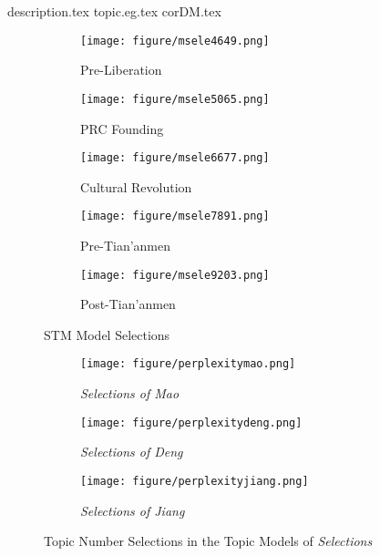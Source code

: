 \documentclass[abstracton,UTF8]{ctexart}
\begin{document}
\clearpage



\clearpage
\appendix
\appendixpage
\addappheadtotoc

{description.tex}
{topic.eg.tex}
{corDM.tex}






\begin{figure}[ht]
	\begin{subfigure}{0.45\textwidth}
		\texttt{[image: figure/msele4649.png]}
		\caption{Pre-Liberation}
		\label{f:msele46}
	\end{subfigure}
	\begin{subfigure}{0.45\textwidth}
		\texttt{[image: figure/msele5065.png]}
		\caption{PRC Founding}
		\label{f:msele50}
	\end{subfigure}
	\begin{subfigure}{0.45\textwidth}
		\texttt{[image: figure/msele6677.png]}
		\caption{Cultural Revolution}
		\label{f:msele66}
	\end{subfigure}
	\begin{subfigure}{0.45\textwidth}
		\texttt{[image: figure/msele7891.png]}
		\caption{Pre-Tian'anmen}
		\label{f:msele78}
	\end{subfigure}
	\begin{subfigure}{0.45\textwidth}
		\texttt{[image: figure/msele9203.png]}
		\caption{Post-Tian'anmen}
		\label{f:msele92}
	\end{subfigure}
	\caption{STM Model Selections}
	\label{f:mselermrb}
\end{figure}


\begin{figure}[h!]
	\begin{subfigure}{0.33\textwidth}
		\texttt{[image: figure/perplexitymao.png]}
		\caption{\textit{Selections of Mao}}
		\label{f:perplexitymao}
	\end{subfigure}
	\begin{subfigure}{0.33\textwidth}
		\texttt{[image: figure/perplexitydeng.png]}
		\caption{\textit{Selections of Deng}}
		\label{f:perplexitydeng}
	\end{subfigure}
	\begin{subfigure}{0.33\textwidth}
		\texttt{[image: figure/perplexityjiang.png]}
		\caption{\textit{Selections of Jiang}}
		\label{f:perplexityjiang}
	\end{subfigure}
	\caption{Topic Number Selections in the Topic Models of \textit{Selections}}
	\label{f:perplexity.sele}
\end{figure}
\end{document}
